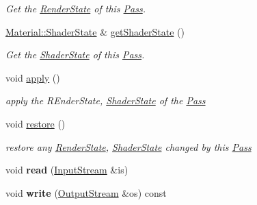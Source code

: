 \begin{DoxyCompactItemize}
\begin{DoxyCompactList}\small\item\em Get the \hyperlink{class_i_dream_sky_1_1_material_1_1_render_state}{Render\+State} of this \hyperlink{class_i_dream_sky_1_1_material_1_1_pass}{Pass}. \end{DoxyCompactList}\item 
\hyperlink{class_i_dream_sky_1_1_material_1_1_shader_state}{Material\+::\+Shader\+State} \& \hyperlink{class_i_dream_sky_1_1_material_1_1_pass_a264601abd6e2243c0e734d67ed95b8c6}{get\+Shader\+State} ()
\begin{DoxyCompactList}\small\item\em Get the \hyperlink{class_i_dream_sky_1_1_material_1_1_shader_state}{Shader\+State} of this \hyperlink{class_i_dream_sky_1_1_material_1_1_pass}{Pass}. \end{DoxyCompactList}\item 
void \hyperlink{class_i_dream_sky_1_1_material_1_1_pass_a0a060b8be5270104743fdb8efe5fa348}{apply} ()\hypertarget{class_i_dream_sky_1_1_material_1_1_pass_a0a060b8be5270104743fdb8efe5fa348}{}\label{class_i_dream_sky_1_1_material_1_1_pass_a0a060b8be5270104743fdb8efe5fa348}

\begin{DoxyCompactList}\small\item\em apply the R\+Ender\+State, \hyperlink{class_i_dream_sky_1_1_material_1_1_shader_state}{Shader\+State} of the \hyperlink{class_i_dream_sky_1_1_material_1_1_pass}{Pass} \end{DoxyCompactList}\item 
void \hyperlink{class_i_dream_sky_1_1_material_1_1_pass_afb19c57c57e99824bee63fded7c4cb50}{restore} ()\hypertarget{class_i_dream_sky_1_1_material_1_1_pass_afb19c57c57e99824bee63fded7c4cb50}{}\label{class_i_dream_sky_1_1_material_1_1_pass_afb19c57c57e99824bee63fded7c4cb50}

\begin{DoxyCompactList}\small\item\em restore any \hyperlink{class_i_dream_sky_1_1_material_1_1_render_state}{Render\+State}, \hyperlink{class_i_dream_sky_1_1_material_1_1_shader_state}{Shader\+State} changed by this \hyperlink{class_i_dream_sky_1_1_material_1_1_pass}{Pass} \end{DoxyCompactList}\item 
void {\bfseries read} (\hyperlink{class_i_dream_sky_1_1_input_stream}{Input\+Stream} \&is)\hypertarget{class_i_dream_sky_1_1_material_1_1_pass_a5630ce4c5ed58e481429dcd49a73309b}{}\label{class_i_dream_sky_1_1_material_1_1_pass_a5630ce4c5ed58e481429dcd49a73309b}

\item 
void {\bfseries write} (\hyperlink{class_i_dream_sky_1_1_output_stream}{Output\+Stream} \&os) const \hypertarget{class_i_dream_sky_1_1_material_1_1_pass_a828c2f82220231c8b1a5aa7140a1e3bc}{}\label{class_i_dream_sky_1_1_material_1_1_pass_a828c2f82220231c8b1a5aa7140a1e3bc}

\end{DoxyCompactItemize}
